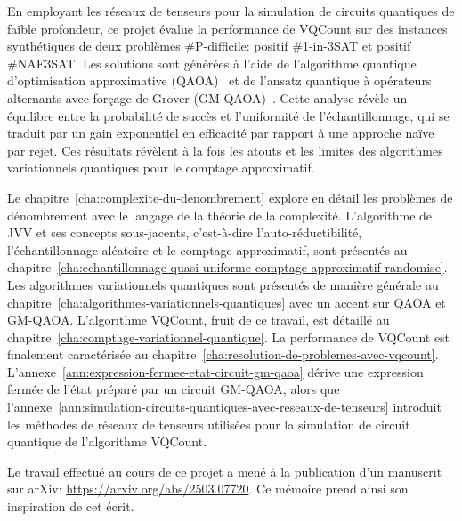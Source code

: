 En employant les réseaux de tenseurs pour la simulation de circuits quantiques de faible profondeur, ce projet évalue la performance de VQCount sur des instances synthétiques de deux problèmes \textsf{\#P}-difficile: positif \#1-in-3SAT et positif \#NAE3SAT. Les solutions sont générées à l'aide de l'algorithme quantique d'optimisation approximative (QAOA)~\cite{farhiQuantumApproximateOptimization2014} et de l'ansatz quantique à opérateurs alternants avec forçage de Grover (GM-QAOA)~\cite{bartschiGroverMixersQAOA2020}. Cette analyse révèle un équilibre entre la probabilité de succès et l'uniformité de l'échantillonnage, qui se traduit par un gain exponentiel en efficacité par rapport à une approche naïve par rejet. Ces résultats révèlent à la fois les atouts et les limites des algorithmes variationnels quantiques pour le comptage approximatif.

Le chapitre~\ref{cha:complexite-du-denombrement} explore en détail les problèmes de dénombrement avec le langage de la théorie de la complexité. L'algorithme de JVV et ses concepts sous-jacents, c'est-à-dire l'auto-réductibilité, l'échantillonnage aléatoire et le comptage approximatif, sont présentés au chapitre~\ref{cha:echantillonnage-quasi-uniforme-comptage-approximatif-randomise}. Les algorithmes variationnels quantiques sont présentés de manière générale au chapitre~\ref{cha:algorithmes-variationnels-quantiques} avec un accent sur QAOA et GM-QAOA. L'algorithme VQCount, fruit de ce travail, est détaillé au chapitre~\ref{cha:comptage-variationnel-quantique}. La performance de VQCount est finalement caractérisée au chapitre~\ref{cha:resolution-de-problemes-avec-vqcount}. L'annexe~\ref{ann:expression-fermee-etat-circuit-gm-qaoa} dérive une expression fermée de l'état préparé par un circuit GM-QAOA, alors que l'annexe~\ref{ann:simulation-circuits-quantiques-avec-reseaux-de-tenseurs} introduit les méthodes de réseaux de tenseurs utilisées pour la simulation de circuit quantique de l'algorithme VQCount.

Le travail effectué au cours de ce projet a mené à la publication d'un manuscrit sur arXiv: \url{https://arxiv.org/abs/2503.07720}. Ce mémoire prend ainsi son inspiration de cet écrit.